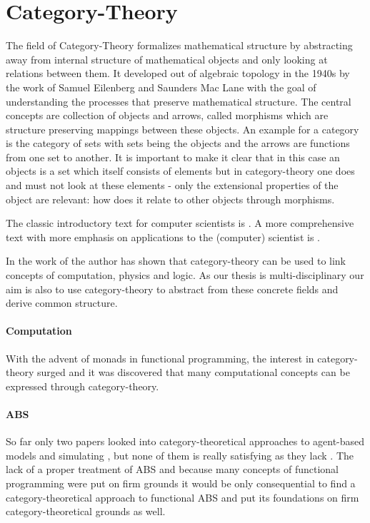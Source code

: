 \section{Category-Theory}
The field of Category-Theory formalizes mathematical structure by abstracting away from internal structure of mathematical objects and only looking at relations between them. It developed out of algebraic topology in the 1940s by the work of Samuel Eilenberg and Saunders Mac Lane with the goal of understanding the processes that preserve mathematical structure.
The central concepts are collection of objects and arrows, called morphisms which are structure preserving mappings between these objects. An example for a category is the category of sets with sets being the objects and the arrows are functions from one set to another. It is important to make it clear that in this case an objects is a set which itself consists of elements but in category-theory one does and must not look at these elements - only the extensional properties of the object are relevant: how does it relate to other objects through morphisms.

The classic introductory text for computer scientists is \cite{pierce_basic_1991}. A more comprehensive text with more emphasis on applications to the (computer) scientist is \cite{spivak_category_2014}.

In the work of  \cite{baez_physics_2009} the author has shown that category-theory can be used to link concepts of computation, physics and logic. As our thesis is multi-disciplinary our aim is also to use category-theory to abstract from these concrete fields and derive common structure.

\paragraph{Computation}
With the advent of monads in functional programming, the interest in category-theory surged and it was discovered that many computational concepts can be expressed through category-theory.

\paragraph{ABS}
So far only two papers looked into category-theoretical approaches to agent-based models and simulating \cite{beheshti_analyzing_2013}, \cite{lloyd_category-theoretic_2010} but none of them is really satisfying as they lack . The lack of a proper treatment of ABS and because many concepts of functional programming were put on firm grounds it would be only consequential to find a category-theoretical approach to functional ABS and put its foundations on firm category-theoretical grounds as well.

